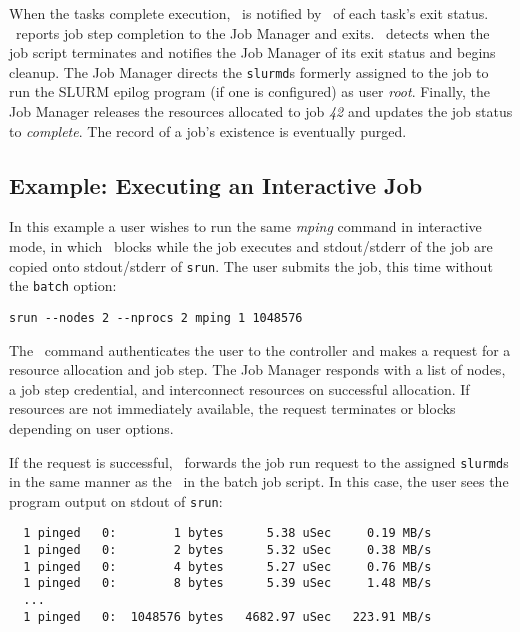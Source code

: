 \documentclass[10pt,onecolumn,times]{llncs}
\begin{document}
{When the tasks complete execution, \srun\ is notified by \slurmd\ of
each task's exit status. \srun\ reports job step completion to the Job
Manager and exits.  \slurmd\ detects when the job script terminates and
notifies the Job Manager of its exit status and begins cleanup.  The Job
Manager directs the {\tt slurmd}s formerly assigned to the job to run
the SLURM epilog program (if one is configured) as user {\em root}.
Finally, the Job Manager releases the resources allocated to job {\em 42} 
and updates the job status to {\em complete}. The record of a job's
existence is eventually purged.

\subsection{Example:  Executing an Interactive Job}

In this example a user wishes to run the same {\em mping} command 
in interactive mode, in which \srun\ blocks while the job executes 
and stdout/stderr of the job are copied onto stdout/stderr of {\tt srun}.
The user submits the job, this time without the {\tt batch} option:

\begin{verbatim}
srun --nodes 2 --nprocs 2 mping 1 1048576
\end{verbatim}

The \srun\ command authenticates the user to the controller and makes a
request for a resource allocation and job step. The Job Manager
responds with a list of nodes, a job step credential, and interconnect
resources on successful allocation. If resources are not immediately
available, the request terminates or blocks depending on user options.

If the request is successful, \srun\ forwards the job run request to
the assigned {\tt slurmd}s in the same manner as the \srun\ in the batch
job script. In this case, the user sees the program output on stdout of
{\tt srun}:

\begin{verbatim}
  1 pinged   0:        1 bytes      5.38 uSec     0.19 MB/s                     
  1 pinged   0:        2 bytes      5.32 uSec     0.38 MB/s                     
  1 pinged   0:        4 bytes      5.27 uSec     0.76 MB/s                     
  1 pinged   0:        8 bytes      5.39 uSec     1.48 MB/s                     
  ...
  1 pinged   0:  1048576 bytes   4682.97 uSec   223.91 MB/s              
\end{verbatim}

}
\end{document}
